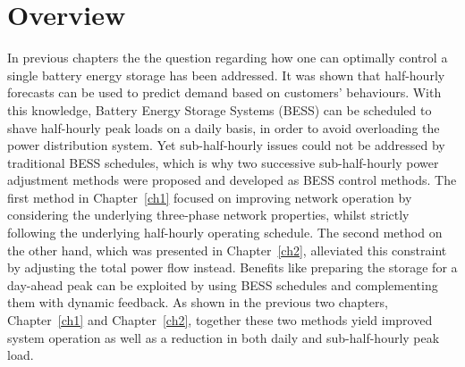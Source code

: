 \section{Overview}
\label{ch3:sec:overview}

In previous chapters the the question regarding how one can optimally control a single battery energy storage has been addressed.
It was shown that half-hourly forecasts can be used to predict demand based on customers' behaviours.
With this knowledge, Battery Energy Storage Systems (BESS) can be scheduled to shave half-hourly peak loads on a daily basis, in order to avoid overloading the power distribution system.
Yet sub-half-hourly issues could not be addressed by traditional BESS schedules, which is why two successive sub-half-hourly power adjustment methods were proposed and developed as BESS control methods.
The first method in Chapter~\ref{ch1} focused on improving network operation by considering the underlying three-phase network properties, whilst strictly following the underlying half-hourly operating schedule.
The second method on the other hand, which was presented in Chapter~\ref{ch2}, alleviated this constraint by adjusting the total power flow instead.
Benefits like preparing the storage for a day-ahead peak can be exploited by using BESS schedules and complementing them with dynamic feedback.
As shown in the previous two chapters, Chapter~\ref{ch1} and Chapter~\ref{ch2}, together these two methods yield improved system operation as well as a reduction in both daily and sub-half-hourly peak load.


